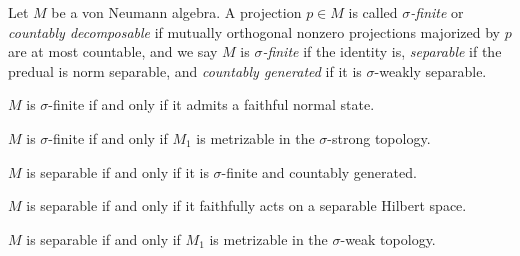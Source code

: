 \documentclass{../../large}
\begin{document}
\begin{prb}
Let $M$ be a von Neumann algebra.
A projection $p\in M$ is called \emph{$\sigma$-finite} or \emph{countably decomposable} if mutually orthogonal nonzero projections majorized by $p$ are at most countable, and we say $M$ is \emph{$\sigma$-finite} if the identity is, \emph{separable} if the predual is norm separable, and \emph{countably generated} if it is $\sigma$-weakly separable.

\begin{parts}
\item $M$ is $\sigma$-finite if and only if it admits a faithful normal state.
\item $M$ is $\sigma$-finite if and only if $M_1$ is metrizable in the $\sigma$-strong topology.
\item $M$ is separable if and only if it is $\sigma$-finite and countably generated.
\item $M$ is separable if and only if it faithfully acts on a separable Hilbert space.
\item $M$ is separable if and only if $M_1$ is metrizable in the $\sigma$-weak topology.
\end{parts}
\end{prb}
\end{document}
